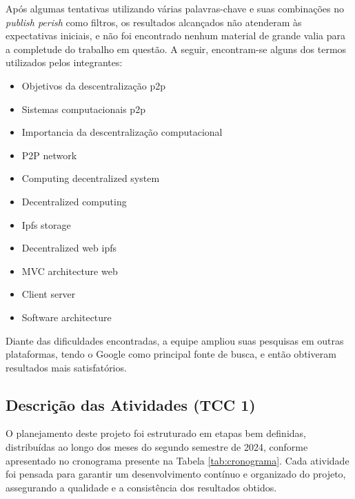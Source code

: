 Após algumas tentativas utilizando várias palavras-chave e suas combinações no \textit{publish perish} como filtros, os resultados alcançados não atenderam às expectativas iniciais, e não foi encontrado nenhum material de grande valia para a completude do trabalho em questão. A seguir, encontram-se alguns dos termos utilizados pelos integrantes: 

\begin{itemize}
    \item Objetivos da descentralização p2p
    \item Sistemas computacionais p2p
    \item Importancia da descentralização computacional
    \item P2P network
    \item Computing decentralized system
    \item Decentralized computing
    \item Ipfs storage
    \item Decentralized web ipfs
    \item MVC architecture web
    \item Client server
    \item Software architecture
\end{itemize}

Diante das dificuldades encontradas, a equipe ampliou suas pesquisas em outras plataformas, tendo o Google como principal fonte de busca, e então obtiveram resultados mais satisfatórios. 

\subsection{Descrição das Atividades (TCC 1)}
O planejamento deste projeto foi estruturado em etapas bem definidas, distribuídas ao longo dos meses do segundo semestre de 2024, conforme apresentado no cronograma presente na Tabela \ref{tab:cronograma}. Cada atividade foi pensada para garantir um desenvolvimento contínuo e organizado do projeto, assegurando a qualidade e a consistência dos resultados obtidos.

